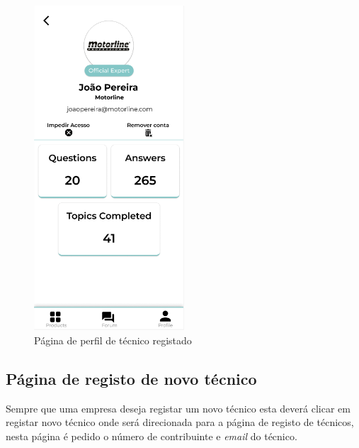 \begin{figure}[htb]
    \centering
    \includegraphics[width=0.5\textwidth]{images/mockups/professional_profile.png}
    \caption{Página de perfil de técnico registado}
    \label{fig:32}
\end{figure}

\subsection{Página de registo de novo técnico}

Sempre que uma empresa deseja registar um novo técnico esta deverá clicar em registar novo técnico onde será
direcionada para a página de registo de técnicos, nesta página é pedido o número de contribuinte e \textit{email} do 
técnico.

